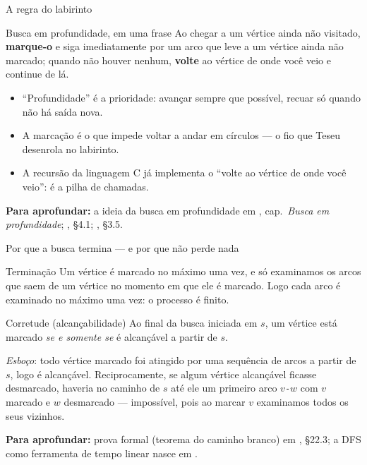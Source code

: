 \documentclass[aspectratio=169]{beamer}
\newcommand{\fonte}[1]{%
  \vfill
  {\tiny\color{gray!55!black}\textbf{Para aprofundar:} #1\par}%
}
\begin{document}
\begin{frame}{A regra do labirinto}
  \begin{block}{Busca em profundidade, em uma frase}
    {\small Ao chegar a um vértice ainda não visitado, \textbf{marque-o} e siga
    imediatamente por um arco que leve a um vértice ainda não marcado; quando não
    houver nenhum, \textbf{volte} ao vértice de onde você veio e continue de lá.}
  \end{block}
  \medskip
  {\small
  \begin{itemize}\small
    \item ``Profundidade'' é a prioridade: avançar sempre que possível, recuar só
          quando não há saída nova.
    \item A marcação é o que impede voltar a andar em círculos --- o fio que
          Teseu desenrola no labirinto.
    \item A recursão da linguagem C já implementa o ``volte ao vértice de onde
          você veio'': é a pilha de chamadas.
  \end{itemize}}
  \fonte{a ideia da busca em profundidade em \cite{feofiloff2020algoritmos},
  cap.\ \emph{Busca em profundidade}; \cite{sedgewick2011algorithms}, §4.1;
  \cite{levitin2012introduction}, §3.5.}
\end{frame}

\begin{frame}{Por que a busca termina --- e por que não perde nada}
  \begin{block}{Terminação}
    {\small Um vértice é marcado no máximo uma vez, e só examinamos os arcos que
    saem de um vértice no momento em que ele é marcado. Logo cada arco é examinado
    no máximo uma vez: o processo é finito.}
  \end{block}
  \begin{block}{Corretude (alcançabilidade)}
    {\small Ao final da busca iniciada em $s$, um vértice está marcado
    \emph{se e somente se} é alcançável a partir de $s$.}
  \end{block}
  {\scriptsize \emph{Esboço}: todo vértice marcado foi atingido por uma sequência
  de arcos a partir de $s$, logo é alcançável. Reciprocamente, se algum vértice
  alcançável ficasse desmarcado, haveria no caminho de $s$ até ele um primeiro
  arco $v$\texttt{-}$w$ com $v$ marcado e $w$ desmarcado --- impossível, pois ao
  marcar $v$ examinamos todos os seus vizinhos.}
  \fonte{prova formal (teorema do caminho branco) em
  \cite{cormen2009introduction}, §22.3; a DFS como ferramenta de tempo linear
  nasce em \cite{tarjan1972depth}.}
\end{frame}
\end{document}
